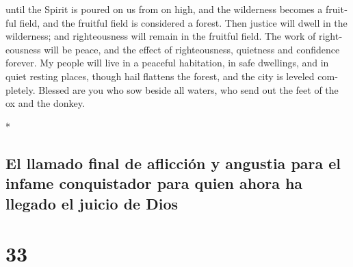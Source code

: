 \begin{paracol}{2}
\begin{otherlanguage}{english}
 until the Spirit is poured on us from on high, and the
wilderness becomes a fruitful field, and the fruitful field is
considered a forest.  Then justice will dwell in the
wilderness; and righteousness will remain in the fruitful field.
 The work of righteousness will be peace, and the effect
of righteousness, quietness and confidence forever.  My
people will live in a peaceful habitation, in safe dwellings, and in
quiet resting places,  though hail flattens the forest,
and the city is leveled completely.  Blessed are you who
sow beside all waters, who send out the feet of the ox and the donkey.

\end{otherlanguage}

\switchcolumn[0]*

\hypertarget{el-llamado-final-de-aflicciuxf3n-y-angustia-para-el-infame-conquistador-para-quien-ahora-ha-llegado-el-juicio-de-dios}{%
\subsection{El llamado final de aflicción y angustia para el infame
conquistador para quien ahora ha llegado el juicio de
Dios}\label{el-llamado-final-de-aflicciuxf3n-y-angustia-para-el-infame-conquistador-para-quien-ahora-ha-llegado-el-juicio-de-dios}}

\hypertarget{section-64}{%
\section{33}\label{section-64}}


\end{paracol}
